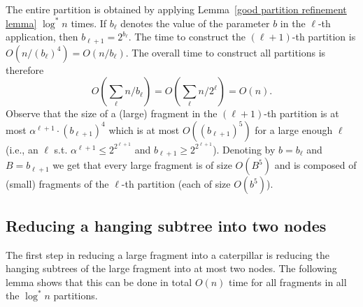 \documentclass[a4paper,UKenglish]{lipics-v2016}
\theoremstyle{plain}
\begin{document}
\noindent The entire partition is obtained by applying Lemma~\ref{good partition refinement lemma} $\log^{*}n$ times. 
If $b_{\ell}$ denotes the value of the parameter $b$ in the $\ell$-th application, then  $b_{\ell+1}=2^{b_{\ell}}$. The time to construct the $(\ell+1)$-th partition is $O(n/(b_{\ell})^{4})=O(n/b_{\ell})$. The overall time to construct all partitions is therefore 
$$ O(\sum_{\ell} {n}/{b_{\ell}}) = O(\sum_{\ell} {n}/{2^{\ell}}) = O(n).$$
Observe that the size of a (large) fragment in the $(\ell+1)$-th partition is at most $\alpha^{\ell+1} \cdot (b_{\ell+1})^{4}$ which is at most $O((b_{\ell+1})^5)$ for a large enough $\ell$ (i.e., an $\ell$ s.t. $\alpha^{\ell+1}\leq 2^{2^{\ell+1}}$ and $b_{\ell+1}\geq 2^{2^{\ell+1}}$).  Denoting by $b=b_{\ell}$ and $B=b_{\ell+1}$  we get that every large fragment is of size $O(B^5)$ and is composed of (small) fragments of the $\ell$-th partition (each of size $O(b^5)$). 








\subsection{Reducing a hanging subtree into two nodes}\label{section:lemma1}
The first step in reducing a large fragment into a caterpillar is reducing the hanging subtrees of the large fragment into at most two nodes. The following lemma shows that this can be done in total $O(n)$ time for all fragments in all the $\log^* n$ partitions.
\end{document}
